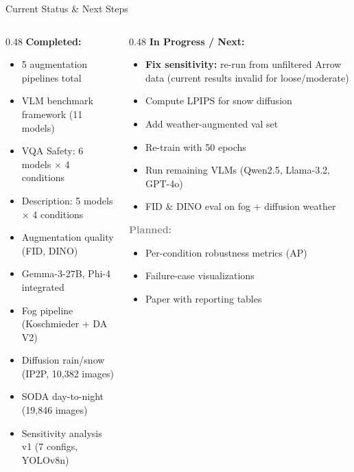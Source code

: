 \documentclass[aspectratio=169, 10pt]{beamer}
\begin{document}
\begin{frame}{Current Status \& Next Steps}
\begin{columns}[T]
\begin{column}{0.48\textwidth}
\textbf{\textcolor{okgreen}{Completed:}}
\begin{itemize}
    \item[\textcolor{okgreen}{$\checkmark$}] 5 augmentation pipelines total
    \item[\textcolor{okgreen}{$\checkmark$}] VLM benchmark framework (11 models)
    \item[\textcolor{okgreen}{$\checkmark$}] VQA Safety: 6 models $\times$ 4 conditions
    \item[\textcolor{okgreen}{$\checkmark$}] Description: 5 models $\times$ 4 conditions
    \item[\textcolor{okgreen}{$\checkmark$}] Augmentation quality (FID, DINO)
    \item[\textcolor{okgreen}{$\checkmark$}] Gemma-3-27B, Phi-4 integrated
    \item[\textcolor{okgreen}{$\checkmark$}] Fog pipeline (Koschmieder + DA V2)
    \item[\textcolor{okgreen}{$\checkmark$}] Diffusion rain/snow (IP2P, 10,382 images)
    \item[\textcolor{okgreen}{$\checkmark$}] SODA day-to-night (19,846 images)
    \item[\textcolor{okgreen}{$\checkmark$}] Sensitivity analysis v1 (7 configs, YOLOv8n)
\end{itemize}
\end{column}
\begin{column}{0.48\textwidth}
\textbf{\textcolor{infobl}{In Progress / Next:}}
\begin{itemize}
    \item[\textcolor{warnred}{$\circ$}] \textbf{Fix sensitivity:} re-run from unfiltered Arrow data (current results invalid for loose/moderate)
    \item[\textcolor{warnred}{$\circ$}] Compute LPIPS for snow diffusion
    \item[\textcolor{warnred}{$\circ$}] Add weather-augmented val set
    \item[\textcolor{infobl}{$\circ$}] Re-train with 50 epochs
    \item[\textcolor{infobl}{$\circ$}] Run remaining VLMs (Qwen2.5, Llama-3.2, GPT-4o)
    \item[\textcolor{infobl}{$\circ$}] FID \& DINO eval on fog + diffusion weather
\end{itemize}

\vspace{0.3em}
\textbf{\textcolor{gray}{Planned:}}
\begin{itemize}
    \item[\textcolor{gray}{$\circ$}] Per-condition robustness metrics (AP)
    \item[\textcolor{gray}{$\circ$}] Failure-case visualizations
    \item[\textcolor{gray}{$\circ$}] Paper with reporting tables
\end{itemize}
\end{column}
\end{columns}
\end{frame}
\end{document}
